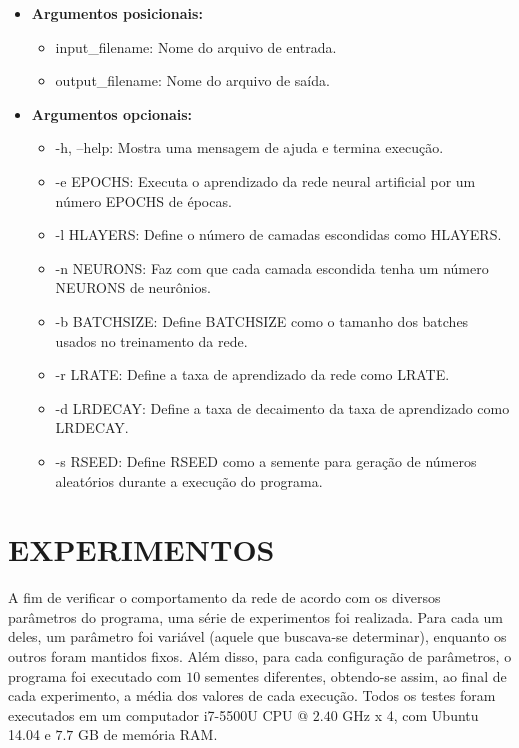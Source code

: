 \documentclass[12pt]{article}
\begin{document}
\begin{itemize}
	\item \textbf{Argumentos posicionais:}

	\begin{itemize}
		\item input\_filename: Nome do arquivo de entrada.
	 	\item output\_filename: Nome do arquivo de saída.
	\end{itemize}

	\item \textbf{Argumentos opcionais:}

	\begin{itemize}
		\item -h, --help: Mostra uma mensagem de ajuda e termina
		execução.
		\item -e EPOCHS: Executa o aprendizado da rede neural artificial
		por um número EPOCHS de épocas.
		\item -l HLAYERS: Define o número de camadas escondidas como 
		HLAYERS.
		\item -n NEURONS: Faz com que cada camada escondida tenha
		um número NEURONS de neurônios.
		\item -b BATCHSIZE: Define BATCHSIZE como o tamanho dos
		batches usados no treinamento da rede.
		\item -r LRATE: Define a taxa de aprendizado da rede como LRATE.
		\item -d LRDECAY: Define a taxa de decaimento da taxa de
		aprendizado como LRDECAY.
		\item -s RSEED: Define RSEED como a semente para geração de 
		números aleatórios durante a execução do programa.
	\end{itemize}
\end{itemize}

\section{EXPERIMENTOS} \label{sec:exp}

A fim de verificar o comportamento da rede de acordo com os diversos
parâmetros do programa, uma série de experimentos foi realizada. Para
cada um deles, um parâmetro foi variável (aquele que buscava-se 
determinar), enquanto os outros foram mantidos fixos.
Além disso, para cada configuração de parâmetros, o programa foi
executado com $ 10 $ sementes diferentes, obtendo-se assim, ao final
de cada experimento, a média dos valores de cada execução.
Todos os testes foram executados em um computador i7-5500U CPU @ 
$ 2.40 $ GHz x 4, com Ubuntu 14.04 e $ 7.7 $ GB de memória RAM.
\end{document}
